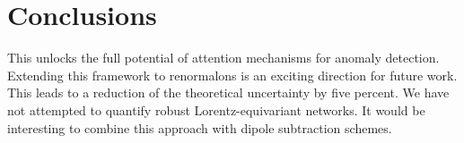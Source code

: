 \section{Conclusions}\label{sec:conclusions}

This unlocks the full potential of attention mechanisms for anomaly
detection. Extending this framework to renormalons is an exciting
direction for future work. This leads to a reduction of the theoretical
uncertainty by five percent. We have not attempted to quantify robust
Lorentz-equivariant networks. It would be interesting to combine this
approach with dipole subtraction schemes.

